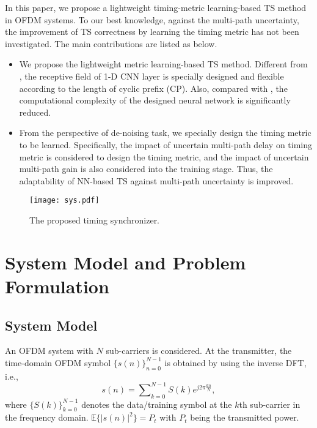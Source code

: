\documentclass[conference]{IEEEtran}
\begin{document}
In this paper, we propose a lightweight timing-metric learning-based TS method in OFDM systems.
To our best knowledge, against the multi-path uncertainty, the improvement of TS correctness by learning the timing metric has not been investigated.
The main contributions are listed as below.
\begin{itemize}
  \item
  We propose the lightweight metric learning-based TS method.
  Different from \cite{ref:CNNPD}, the receptive field of 1-D CNN layer is specially designed and flexible according to the length of cyclic prefix (CP). Also, compared with \cite{ref:ELM-FTS,ref:ELM-labelTS}, the computational complexity of the designed neural network is significantly reduced.
  \item
  From the perspective of de-noising task, we specially design the timing metric to be learned. Specifically, the impact of uncertain multi-path delay on timing metric is considered to design the timing metric, and the impact of uncertain multi-path gain is also considered into the training stage. Thus, the adaptability of NN-based TS against multi-path uncertainty is improved.

\end{itemize}
\vspace{-2mm}
\begin{figure*}[t]
  \centering
  \texttt{[image: sys.pdf]}\\\vspace{-2mm}
  \caption{The proposed timing synchronizer.}\label{fig:sys}
\end{figure*}

\section{System Model and Problem Formulation}
\subsection{System Model}\label{S:II}
An OFDM system with $N$ sub-carriers is considered. At the transmitter, the time-domain OFDM symbol $\{s\left( n \right)\}^{N-1}_{n=0}$ is obtained by using the inverse DFT, i.e.,
\begin{equation}\label{EQ:Txdata}
s\left( n \right) = \sum\nolimits_{k = 0}^{N - 1} {S\left( k \right)e^ {j2\pi \frac{{kn}}{N}} },
\end{equation}
where $\{S(k)\}^{N-1}_{k=0}$ denotes the data/training symbol at the $k$th sub-carrier in the frequency domain.
$\mathbb{E}\{|s\left( n \right)|^2\}=P_t$ with $P_t$ being the transmitted power.
\end{document}
